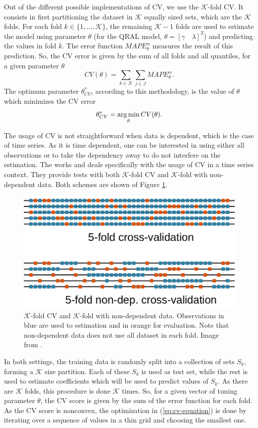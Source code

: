 Out of the different possible implementations of CV, we use the $\mathcal{K}$-fold CV. It consists in first partitioning the dataset in $\mathcal{K}$ equally sized sets, which are the $\mathcal{K}$ folds. For each fold $k \in \{1,\dots,\mathcal{K}\}$, the remaining $\mathcal{K}-1$ folds are used to estimate the model using parameter $\theta$ (for the QRAL model, $\theta = [\gamma \quad \lambda]^T$) and predicting the values in fold $k$. The error function $MAPE^\alpha_\theta$ measures the result of this prediction.
So, the CV error is given by the sum of all folds and all quantiles, for a given parameter $\theta$
\[
 CV(\theta) = \sum_{k \in \mathcal{K}} \sum_{j \in J} MAPE^\alpha_\theta.\label{eq:cv-error}
\]
The optimum parameter $\theta^*_{CV}$, according to this methodology, is the value of $\theta$ which minimizes the CV error
\begin{equation}
\theta_{CV}^* = \argmin_\theta CV(\theta) .\label{eq:cv-equation}
\end{equation}

The usage of CV is not straightforward when data is dependent, which is the case of time series. As it is time dependent, one can be interested in using either all observations or to take the dependency away to do not interfere on the estimation. The works
\cite{bergmeir_note_2017} and \cite{bergmeir_use_2012} deals specifically with the usage of CV in a time series context. They provide tests with both $\mathcal{K}$-fold CV and $\mathcal{K}$-fold with non-dependent data. Both schemes are shown of Figure \ref{fig:cross-validation-scheme}.
\begin{figure}
	\centering
	\includegraphics[width=0.7\linewidth]{Images/Cross-validation-scheme}
	\caption{$\mathcal{K}$-fold CV and $\mathcal{K}$-fold with non-dependent data. Observations in blue are used to estimation and in orange for evaluation. Note that non-dependent data does not use all dataset in each fold. Image from \cite{bergmeir_note_2017}.}
	\label{fig:cross-validation-scheme}
\end{figure}
In both settings, the training data is randomly split into a collection of sets $S_k$, forming a $\mathcal{K}$ size partition. Each of these $S_k$ is used as test set, while the rest is used to estimate coefficients which will be used to predict values of $S_k$. 
As there are $\mathcal{K}$ folds, this procedure is done $\mathcal{K}$ times. 
So, for a given vector of tuning parameter $\theta$, the CV score is given by the sum of the error function for each fold. 
As the CV score is nonconvex, the optimization in (\ref{eq:cv-equation}) is done by iterating over a sequence of values in a thin grid and choosing the smallest one.



